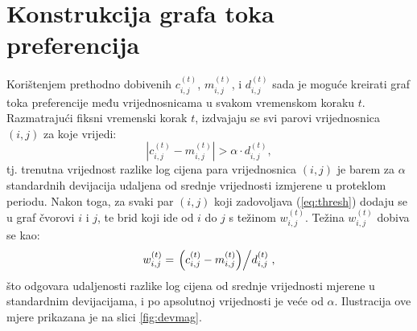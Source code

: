 \documentclass[lmodern, utf8, diplomski, numeric]{fer}
\begin{document}
  \section{Konstrukcija grafa toka preferencija}
  \label{sub:creating-graph}
  Korištenjem prethodno dobivenih $c_{i,j}^{(t)}$, $m_{i,j}^{(t)}$, i $d_{i,j}^{(t)}$ sada je moguće kreirati graf toka preferencije među vrijednosnicama u svakom vremenskom koraku $t$.
  Razmatrajući fiksni vremenski korak $t$, izdvajaju se svi parovi vrijednosnica $(i,j)$ za koje vrijedi:
  \begin{equation}
  \label{eq:thresh}
  \left| c_{i,j}^{(t)} - m_{i,j}^{(t)} \right| > \alpha \cdot d_{i,j}^{(t)},
  \end{equation}
  tj. trenutna vrijednost razlike log cijena para vrijednosnica $(i,j)$ je barem za $\alpha$ standardnih devijacija udaljena od srednje vrijednosti izmjerene u proteklom periodu.
  Nakon toga, za svaki par $(i,j)$ koji zadovoljava (\ref{eq:thresh}) dodaju se u graf čvorovi $i$ i $j$, te brid koji ide od $i$ do $j$ s težinom $w_{i,j}^{(t)}$.
  Težina $w_{i,j}^{(t)}$ dobiva se kao:
  \begin{equation}
  \label{eq:weight}
  w_{i,j}^{(t)} = \left. \left(c_{i,j}^{(t)} - m_{i,j}^{(t)}\right) \middle/ d_{i,j}^{(t)} \right.,
  \end{equation}
  što odgovara udaljenosti razlike log cijena od srednje vrijednosti mjerene u standardnim devijacijama, i po apsolutnoj vrijednosti je veće od $\alpha$.
  Ilustracija ove mjere prikazana je na slici \ref{fig:devmag}.
  
\end{document}
